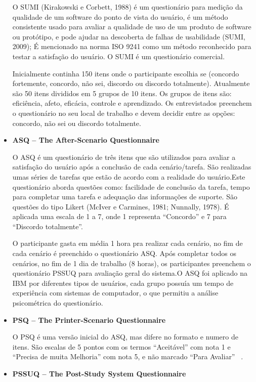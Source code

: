 \begin{itemize}
	O SUMI (Kirakowski e Corbett, 1988) é um questionário para medição da qualidade de um software do ponto de vista do usuário, é um método consistente usado para avaliar a qualidade de uso de um produto de software ou protótipo, e pode ajudar na descoberta de falhas de usabilidade (SUMI, 2009); É mencionado na norma ISO 9241 como um método reconhecido para testar a satisfação do usuário. O SUMI é um questionário comercial. 

	Inicialmente continha 150 itens onde o participante escolhia se (concordo fortemente, concordo, não sei, discordo ou discordo totalmente). Atualmente são 50 itens divididos em 5 grupos de 10 itens. Os grupos de itens são: eficiência, afeto, eficácia, controle e aprendizado. Os entrevistados preenchem o questionário no seu local de trabalho e devem decidir entre as opções: concordo, não sei ou discordo totalmente.

\item \textbf{ASQ – The After-Scenario Questionnaire}

O ASQ é um questionário de três itens que são utilizados para avaliar a satisfação do usuário após a conclusão de cada cenário/tarefa. São realizadas umas séries de tarefas que estão de acordo com a realidade do usuário.Este questionário aborda questões como: facilidade de conclusão da tarefa, tempo para completar uma tarefa e adequação das informações de suporte. São questões do tipo Likert (McIver e Carmines, 1981; Nunnally, 1978). É aplicada uma escala de 1 a 7, onde 1 representa “Concordo” e 7 para “Discordo totalmente”. ~\cite{lewis1995ibm}

O participante gasta em média 1 hora pra realizar cada cenário, no fim de cada cenário é preenchido o questionário ASQ. Após completar todos os cenários, no fim de 1 dia de trabalho (8 horas), os participantes preenchem o questionário PSSUQ para avaliação geral do sistema.O ASQ foi aplicado na IBM por diferentes tipos de usuários, cada grupo possuía um tempo de experiência com sistemas de computador, o que permitiu a análise psicométrica do questionário.


\item \textbf{PSQ – The Printer-Scenario Questionnaire}

O PSQ  é uma versão inicial do ASQ, mas difere no formato e numero de itens.  São escalas de 5 pontos com os termos “Aceitável” com nota 1 e “Precisa de muita Melhoria” com nota 5, e não marcado “Para Avaliar” ~\cite{lewis1995ibm}.

\item \textbf{PSSUQ – The Post-Study System Questionnaire}


\end{itemize}
